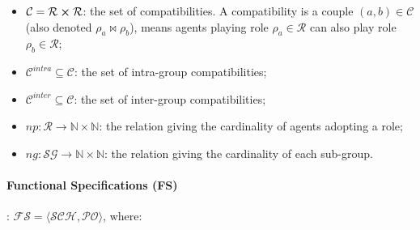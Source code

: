 \documentclass{ecai}
\newcounter{relation}
\begin{document}
\begin{itemize}
\begin{itemize}
              \item $\mathcal{C} = \mathcal{R} \cross \mathcal{R}$: the set of compatibilities. A compatibility is a couple $(a,b) \in \mathcal{C}$ (also denoted $\rho_a \bowtie \rho_b$), means agents playing role $\rho_a \in \mathcal{R}$ can also play role $\rho_b \in \mathcal{R}$;
              \item $\mathcal{C}^{intra} \subseteq \mathcal{C}$: the set of intra-group compatibilities;
              \item $\mathcal{C}^{inter} \subseteq \mathcal{C}$: the set of inter-group compatibilities;

              \item $np: \mathcal{R} \rightarrow \mathbb{N} \times \mathbb{N}$: the relation giving the cardinality of agents adopting a role;
              \item $ng: \mathcal{SG} \rightarrow \mathbb{N} \times \mathbb{N}$: the relation giving the cardinality of each sub-group.

          \end{itemize}

\end{itemize}

\paragraph{\textbf{Functional Specifications (FS)}}: $\mathcal{FS} = \langle \mathcal{SCH}, \mathcal{PO} \rangle$, where:
\end{document}
